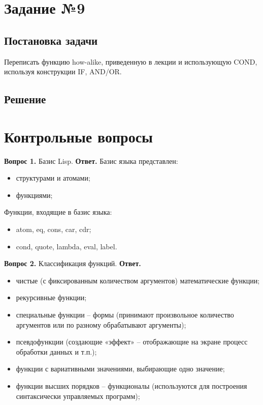 \section*{Задание №9}
\subsection*{Постановка задачи}
Переписать функцию how-alike, приведенную в лекции и использующую COND, используя конструкции IF, AND/OR.

\subsection*{Решение}


\section*{Контрольные вопросы}
\textbf{Вопрос 1.} Базис Lisp. \newline
\indent\textbf{Ответ. }
Базис языка представлен:
\begin{itemize}
	\item структурами и атомами;
	\item функциями;
\end{itemize}

Функции, входящие в базис языка:
\begin{itemize}
	\item atom, eq, cons, car, cdr;
	\item cond, quote, lambda, eval, label.
\end{itemize}

\textbf{Вопрос 2.} Классификация функций.\newline
\indent\textbf{Ответ.} 

\begin{itemize}
	\item чистые (с фиксированным количеством аргументов) математические функции;
	\item рекурсивные функции;
	\item специальные функции – формы (принимают произвольное количество аргументов или по разному обрабатывают аргументы);
	\item псевдофункции (создающие «эффект» – отображающие на экране процесс обработки данных и т.п.);
	\item функции с вариативными значениями, выбирающие одно значение;
	\item функции высших порядков – функционалы (используются для построения синтаксически управляемых программ);
\end{itemize}

